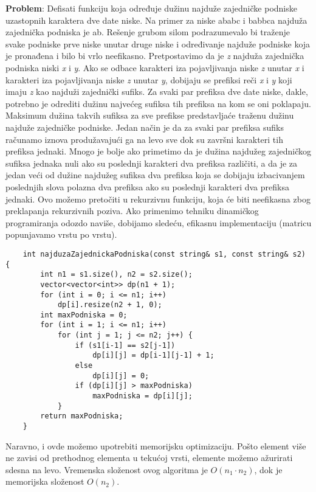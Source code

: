 \documentclass{article}
\begin{document}
\textbf{Problem}: Defisati funkciju koja određuje dužinu najduže zajedničke podniske
uzastopnih karaktera dve date niske. Na primer za niske ababc i babbca najduža
zajednička podniska je ab.
\newline
Rešenje grubom silom podrazumevalo bi traženje svake podniske prve niske
unutar druge niske i određivanje najduže podniske koja je pronađena i bilo bi
vrlo neefikasno.
\newline
Pretpostavimo da
je \textit{z} najduža zajednička podniska niski \textit{x} i \textit{y}. Ako se odbace karakteri iza
pojavljivanja niske \textit{z} unutar \textit{x} i karakteri iza pojavljivanja niske \textit{z} unutar \textit{y},
dobijaju se prefiksi reči \textit{x} i \textit{y} koji imaju \textit{z} kao najduži zajednički sufiks. Za svaki
par prefiksa dve date niske, dakle, potrebno je odrediti dužinu najvećeg sufiksa
tih prefiksa na kom se oni poklapaju. Maksimum dužina takvih sufiksa za sve
prefikse predstavljaće traženu dužinu najduže zajedničke podniske. Jedan način
je da za svaki par prefiksa sufiks računamo iznova produžavajući ga na levo sve
dok su završni karakteri tih prefiksa jednaki. Mnogo je bolje ako primetimo
da je dužina najdužeg zajedničkog sufiksa jednaka nuli ako su poslednji karakteri
dva prefiksa različiti, a da je za jedan veći od dužine najdužeg sufiksa dva
prefiksa koja se dobijaju izbacivanjem poslednjih slova polazna dva prefiksa ako
su poslednji karakteri dva prefiksa jednaki.
Ovo možemo pretočiti u rekurzivnu funkciju, koja će biti neefikasna zbog preklapanja rekurzivnih poziva. Ako primenimo tehniku dinamičkog
programiranja
odozdo naviše, dobijamo sledeću, efikasnu implementaciju (matricu popunjavamo
vrstu po vrstu).
\begin{lstlisting}
    int najduzaZajednickaPodniska(const string& s1, const string& s2) {
        int n1 = s1.size(), n2 = s2.size();
        vector<vector<int>> dp(n1 + 1);
        for (int i = 0; i <= n1; i++)
            dp[i].resize(n2 + 1, 0);
        int maxPodniska = 0;
        for (int i = 1; i <= n1; i++)
            for (int j = 1; j <= n2; j++) {
                if (s1[i-1] == s2[j-1])
                    dp[i][j] = dp[i-1][j-1] + 1;
                else
                    dp[i][j] = 0;
                if (dp[i][j] > maxPodniska)
                    maxPodniska = dp[i][j];
            }
        return maxPodniska;
    }
\end{lstlisting}
Naravno, i ovde možemo upotrebiti memorijsku optimizaciju. Pošto element više
ne zavisi od prethodnog elementa u tekućoj vrsti, elemente možemo ažurirati
sdesna na levo. Vremenska složenost ovog algoritma je $O(n_1\cdot n_2)$, dok je memorijska složenost $O(n_2)$.
\end{document}
